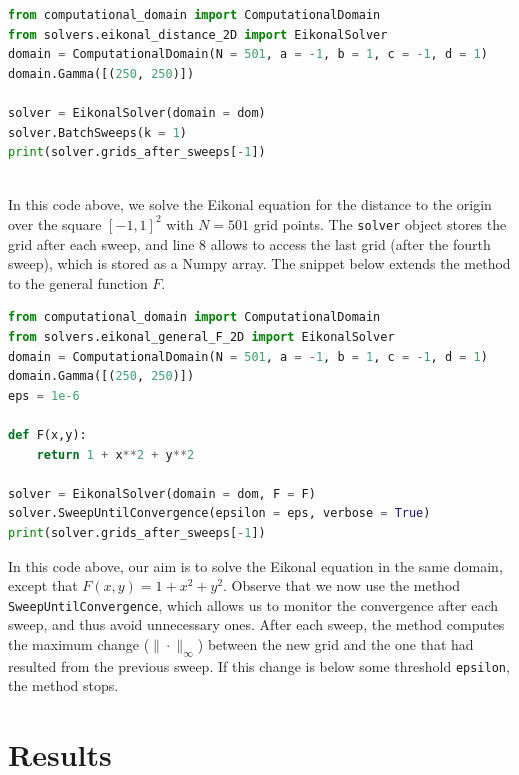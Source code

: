 \documentclass[11pt]{article}
\theoremstyle{definition}
\theoremstyle{remark}
\begin{document}
\begin{lstlisting}[language=Python, caption = Instance of an Eikonal Solver for the 2D distance function]
from computational_domain import ComputationalDomain
from solvers.eikonal_distance_2D import EikonalSolver
domain = ComputationalDomain(N = 501, a = -1, b = 1, c = -1, d = 1)
domain.Gamma([(250, 250)])

solver = EikonalSolver(domain = dom)
solver.BatchSweeps(k = 1)
print(solver.grids_after_sweeps[-1])
\end{lstlisting} \\

\noindent In this code above, we solve the Eikonal equation for the distance to the origin over the square $[-1,1]^2$ with $N=501$ grid points. The \texttt{solver} object stores the grid after each sweep, and line 8 allows to access the last grid (after the fourth sweep), which is stored as a Numpy array. The snippet below extends the method to the general function $F$. \\

\begin{lstlisting}[language=Python, caption = Instance of an Eikonal Solver for a general velocity F]
from computational_domain import ComputationalDomain
from solvers.eikonal_general_F_2D import EikonalSolver
domain = ComputationalDomain(N = 501, a = -1, b = 1, c = -1, d = 1)
domain.Gamma([(250, 250)])
eps = 1e-6

def F(x,y):
    return 1 + x**2 + y**2

solver = EikonalSolver(domain = dom, F = F)
solver.SweepUntilConvergence(epsilon = eps, verbose = True)
print(solver.grids_after_sweeps[-1])
\end{lstlisting}

\noindent In this code above, our aim is to solve the Eikonal equation in the same domain, except that $F(x,y)=1+x^2+y^2$. Observe that we now use the method \texttt{SweepUntilConvergence}, which allows us to monitor the convergence after each sweep, and thus avoid unnecessary ones. After each sweep, the method computes the maximum change ($\|\cdot\|_\infty$) between the new grid and the one that had resulted from the previous sweep. If this change is below some threshold \texttt{epsilon}, the method stops. 

\section{Results}
\end{document}
